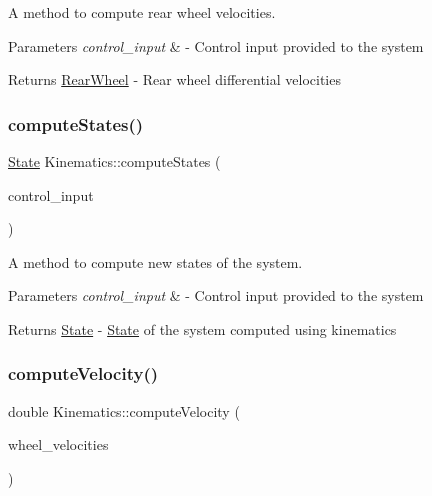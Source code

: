 A method to compute rear wheel velocities. 


\begin{DoxyParams}{Parameters}
{\em control\+\_\+input} & -\/ Control input provided to the system \\
\hline
\end{DoxyParams}
\begin{DoxyReturn}{Returns}
\hyperlink{structRearWheel}{Rear\+Wheel} -\/ Rear wheel differential velocities 
\end{DoxyReturn}
\mbox{\label{classKinematics_abc359954c01ed158fe090e01b5539f06}} 
\subsubsection{\texorpdfstring{compute\+States()}{computeStates()}}
{\footnotesize\ttfamily \hyperlink{structState}{State} Kinematics\+::compute\+States (\begin{DoxyParamCaption}\item[{ackermann\+\_\+msgs\+::\+Ackermann\+Drive\+Stamped \&}]{control\+\_\+input }\end{DoxyParamCaption})}



A method to compute new states of the system. 


\begin{DoxyParams}{Parameters}
{\em control\+\_\+input} & -\/ Control input provided to the system \\
\hline
\end{DoxyParams}
\begin{DoxyReturn}{Returns}
\hyperlink{structState}{State} -\/ \hyperlink{structState}{State} of the system computed using kinematics 
\end{DoxyReturn}
\mbox{\label{classKinematics_a7159c40fdd982621f5def3e8aeb5687d}} 
\subsubsection{\texorpdfstring{compute\+Velocity()}{computeVelocity()}}
{\footnotesize\ttfamily double Kinematics\+::compute\+Velocity (\begin{DoxyParamCaption}\item[{const std\+::vector$<$ double $>$ \&}]{wheel\+\_\+velocities }\end{DoxyParamCaption})}



